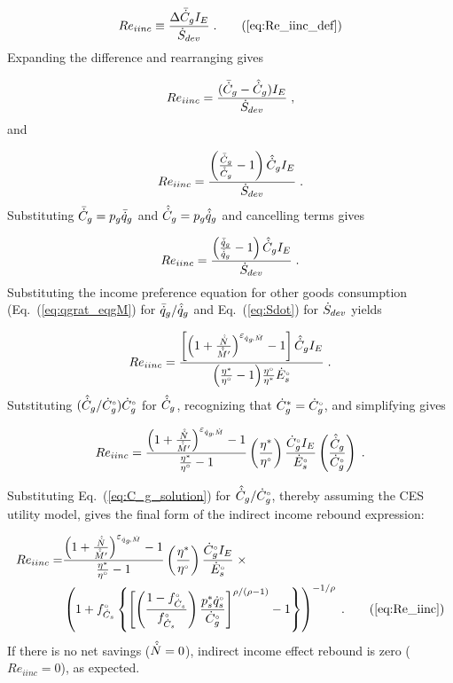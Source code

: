 \begin{equation}
  Re_{iinc} \equiv \frac{\Delta \rainc{C}_g I_E}{\Sdot} \; . \tag{\ref{eq:Re_iinc_def}}
\end{equation}
%
Expanding the difference and rearranging gives

\begin{equation}
  Re_{iinc} = \frac{(\bar{\dot{C}}_g - \hat{\dot{C}}_g) I_E}{\dot{S}_{dev}} \; ,
\end{equation}
%
and

\begin{equation}
  Re_{iinc} = \frac{\left( \frac{\bar{\dot{C}}_g}{\hat{\dot{C}}_g} - 1  \right) \hat{\dot{C}}_g I_E}{\dot{S}_{dev}} \; .
\end{equation}
%
Substituting $\bar{\dot{C}}_g = p_g \bar{\dot{q}}_g$ and $\hat{\dot{C}}_g = p_g \hat{\dot{q}}_g$ and
cancelling terms gives

\begin{equation}
  Re_{iinc} = \frac{\left( \frac{\bar{\dot{q}}_g}{\hat{\dot{q}}_g} - 1  \right) \hat{\dot{C}}_g I_E}{\dot{S}_{dev}} \; .
\end{equation}
%
Substituting the income preference equation for other goods consumption (Eq.~(\ref{eq:qgrat_eqgM})
for $\bar{\dot{q}}_g / \hat{\dot{q}}_g$
and Eq.~(\ref{eq:Sdot}) for $\dot{S}_{dev}$ yields

\begin{equation}
  Re_{iinc} = \frac{\left[ \left( 1 + \frac{\hat{\dot{N}}}{\hat{\dot{M}}^\prime} \right)^{\varepsilon_{\dot{q}_g\!,\dot{M}}} - 1  \right]
              \hat{\dot{C}}_g I_E}{\left( \frac{{\eta}^*}{{}{\eta}^{\scriptscriptstyle \circ}} - 1 \right)\! \frac{{}{\eta}^{\scriptscriptstyle \circ}}{{\eta}^*} {}{\dot{E}}^{\scriptscriptstyle \circ}_s} \; .
\end{equation}
%
Sutstituting $(\hat{\dot{C}}_g/{}{\dot{C}}^{\scriptscriptstyle \circ}_g) {}{\dot{C}}^{\scriptscriptstyle \circ}_g$ for $\hat{\dot{C}}_g$,
recognizing that ${\dot{C}}^*_g = {}{\dot{C}}^{\scriptscriptstyle \circ}_g$, and simplifying gives

\begin{equation}
  Re_{iinc} = \frac{\left( 1 + \frac{\hat{\dot{N}}}{\hat{\dot{M}}^\prime} \right)^{\varepsilon_{\dot{q}_g\!,\dot{M}}} - 1}{\frac{{\eta}^*}{{}{\eta}^{\scriptscriptstyle \circ}} - 1}
              \left( \frac{{\eta}^*}{{}{\eta}^{\scriptscriptstyle \circ}} \right)
              \frac{{}{\dot{C}}^{\scriptscriptstyle \circ}_g I_E}{{}{\dot{E}}^{\scriptscriptstyle \circ}_s}
              \left( \frac{\hat{\dot{C}}_g}{{}{\dot{C}}^{\scriptscriptstyle \circ}_g} \right) \; .
\end{equation}

Substituting Eq.~(\ref{eq:C_g_solution})
for $\hat{\dot{C}}_g / {}{\dot{C}}^{\scriptscriptstyle \circ}_g$,
thereby assuming the CES utility model,
gives the final form
of the indirect income rebound expression:

\begin{align}
  Re_{iinc} = \Reiinceqnexact{} \; . \tag{\ref{eq:Re_iinc}}
\end{align}
%
If there is no net savings ($\hat{\dot{N}} = 0$),
indirect income effect rebound is zero ($Re_{iinc} = 0$), as expected.


